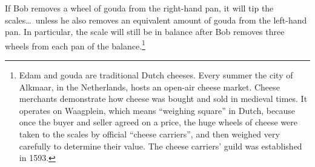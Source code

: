 
If Bob removes a wheel of gouda from the right-hand pan, it will tip the scales\ldots\ unless he also removes an equivalent amount of gouda from the left-hand pan. In particular, the scale will still be in balance after Bob removes three wheels from each pan of the balance.\footnote{Edam and gouda are traditional Dutch cheeses. Every summer the city of Alkmaar, in the Netherlands, hosts an open-air cheese market. Cheese merchants demonstrate how cheese was bought and sold in medieval times. It operates on Waagplein, which means ``weighing square'' in Dutch, because once the buyer and seller agreed on a price, the huge wheels of cheese were taken to the scales by official ``cheese carriers'', and then weighed very carefully to determine their value. The cheese carriers' guild was established in 1593.}

